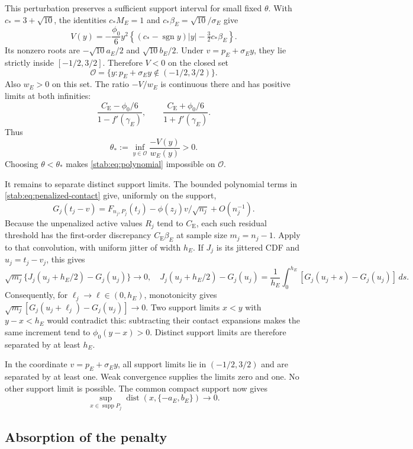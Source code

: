 \documentclass[11pt,a4paper]{article}
\numberwithin{equation}{section}
\theoremstyle{definition}
\theoremstyle{remark}
\newcommand{\CE}{C_{\mathrm E}}
\DeclareMathOperator{\supp}{supp}
\DeclareMathOperator{\dist}{dist}
\DeclareMathOperator{\sgn}{sgn}
\begin{document}
This perturbation preserves a sufficient support interval for small
fixed $\theta$. With $c_*=3+\sqrt{10}$, the identities
$c_*M_E=1$ and $c_*\beta_E=\sqrt{10}/\sigma_E$ give
\[
 V(y)=-\frac{\phi_0}{6}y^2
       \left\{(c_*-\sgn y)|y|-\tfrac32c_*\beta_E\right\}.
\]
Its nonzero roots are $-\sqrt{10}a_E/2$ and $\sqrt{10}b_E/2$.
Under $v=p_E+\sigma_Ey$, they lie strictly inside $[-1/2,3/2]$.
Therefore $V<0$ on the closed set
\[
                    \mathcal O=\{y:p_E+\sigma_Ey\notin(-1/2,3/2)\}.
\]
Also $w_E>0$ on this set. The ratio $-V/w_E$ is continuous there
and has positive limits at both infinities:
\[
 \frac{\CE-\phi_0/6}{1-f'(\gamma_E)},\qquad
 \frac{\CE+\phi_0/6}{1+f'(\gamma_E)}.
\]
Thus
\begin{equation}\label{stab:eq:theta-support}
                  \theta_*:=\inf_{y\in\mathcal O}\frac{-V(y)}{w_E(y)}>0.
\end{equation}
Choosing $\theta<\theta_*$ makes \eqref{stab:eq:polynomial} impossible
on $\mathcal O$.

It remains to separate distinct support limits. The bounded polynomial
terms in \eqref{stab:eq:penalized-contact} give, uniformly on the support,
\[
 G_j(t_j-v)=F_{n_j,P_j}(t_j)
                  -\phi(z_j)v/\sqrt{n_j}+O(n_j^{-1}).
\]
Because the unpenalized active values $R_j$ tend to $\CE$, each
such residual threshold has the first-order discrepancy
$\CE\beta_E$ at sample size $m_j=n_j-1$. Apply \cite[Lemma 2.2]{HC}
to that convolution, with uniform jitter of width $h_E$.
If $J_j$ is its jittered CDF and $u_j=t_j-v_j$, this gives
\[
 \sqrt{m_j}\{J_j(u_j+h_E/2)-G_j(u_j)\}\to0,
\quad
 J_j(u_j+h_E/2)-G_j(u_j)
   =\frac1{h_E}\int_0^{h_E}[G_j(u_j+s)-G_j(u_j)]\,ds.
\]
Consequently, for $\ell_j\to\ell\in(0,h_E)$, monotonicity gives
$\sqrt{m_j}[G_j(u_j+\ell_j)-G_j(u_j)]\to0$.
Two support limits $x<y$ with $y-x<h_E$ would contradict this:
subtracting their contact expansions makes the same increment tend
to $\phi_0(y-x)>0$. Distinct support limits are therefore separated
by at least $h_E$.

In the coordinate $v=p_E+\sigma_E y$, all support limits lie in
$(-1/2,3/2)$ and are separated by at least one. Weak convergence
supplies the limits zero and one. No other support limit is possible.
The common compact support now gives
\begin{equation}\label{stab:eq:clusters}
           \sup_{x\in\supp P_j}\dist(x,\{-a_E,b_E\})\longrightarrow0.
\end{equation}

\subsection{Absorption of the penalty}
\end{document}
